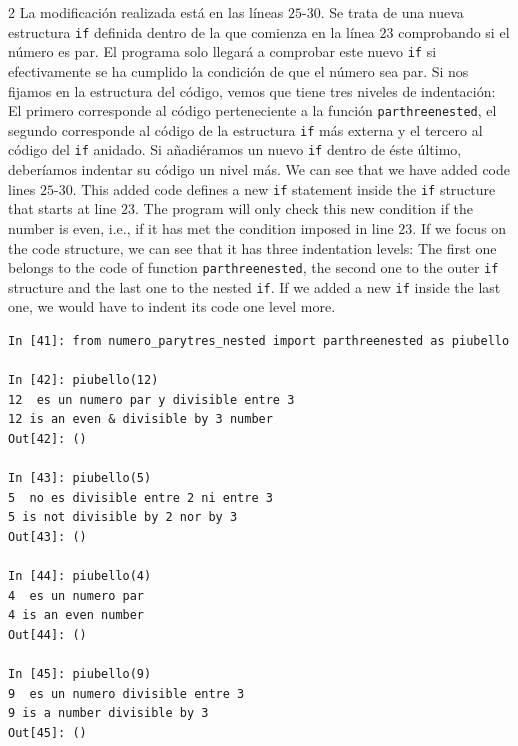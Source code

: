 \begin{paracol}{2}
La modificación realizada está en las líneas $25$-$30$. Se trata de una nueva estructura \texttt{if} definida dentro de la que comienza en la línea $23$ comprobando si el número es par. El programa solo llegará a comprobar este nuevo \texttt{if} si efectivamente se ha cumplido la condición de que el número sea par. Si nos fijamos en la estructura del código, vemos que tiene tres niveles de indentación: El primero corresponde al código perteneciente a la función \texttt{parthreenested}, el segundo corresponde al código de la estructura \texttt{if} más externa y el tercero al código del \texttt{if} anidado. Si añadiéramos un nuevo \texttt{if} dentro de éste último, deberíamos indentar su código un nivel más.
\switchcolumn
We can see that we have added code lines $25$-$30$. This added code defines a new \texttt{if} statement inside the \texttt{if} structure that starts at line $23$. The program will only check this new condition if the number is even, i.e., if it has met the condition imposed in line $23$. If we focus on the code structure, we can see that it has three indentation levels: The first one belongs to the code of function \texttt{parthreenested}, the second one to the outer \texttt{if} structure and the last one to the nested \texttt{if}. If we added a new \texttt{if} inside the last one, we would have to indent its code one level more. 
\end{paracol}

\begin{center}
    \begin{minipage}{.7\textwidth}
    \begin{verbatim}    
In [41]: from numero_parytres_nested import parthreenested as piubello

In [42]: piubello(12)
12  es un numero par y divisible entre 3
12 is an even & divisible by 3 number
Out[42]: ()

In [43]: piubello(5)
5  no es divisible entre 2 ni entre 3
5 is not divisible by 2 nor by 3 
Out[43]: ()

In [44]: piubello(4)
4  es un numero par
4 is an even number
Out[44]: ()

In [45]: piubello(9)
9  es un numero divisible entre 3
9 is a number divisible by 3
Out[45]: ()
\end{verbatim}
\end{minipage}
\end{center}

